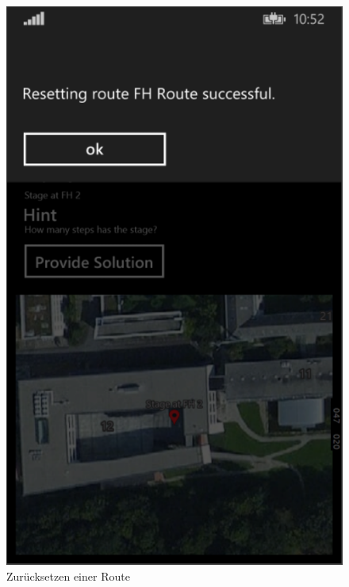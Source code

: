 \documentclass[a4paper,ngerman]{scrartcl}
\begin{document}
\begin{figure}[h]
\centering
\includegraphics[width=.95\textwidth]{images/routeDetailsPage_Resetting}
\caption{Zurücksetzen einer Route}
\end{figure}
\end{document}

